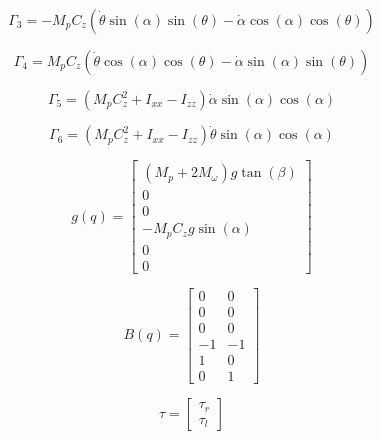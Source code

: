 \documentclass[11pt, twoside]{book}     %
\begin{document}
            \begin{equation}
                \Gamma_3= -M_pC_z(\dot{\theta}\sin(\alpha)\sin(\theta)-\dot{\alpha}\cos(\alpha)\cos(\theta))
            \end{equation}

            \begin{equation}
                \Gamma_4= M_pC_z(\dot{\theta}\cos(\alpha)\cos(\theta)-\dot{\alpha}\sin(\alpha)\sin(\theta))
            \end{equation}

            \begin{equation}
                \Gamma_5= (M_pC_z^{2}+I_{xx}-I_{zz})\dot{\alpha}\sin(\alpha)\cos(\alpha)
            \end{equation}

            \begin{equation}
                \Gamma_6= (M_pC_z^{2}+I_{xx}-I_{zz})\dot{\theta}\sin(\alpha)\cos(\alpha)
            \end{equation}


            \begin{equation}
                g(q) =
                \begin{bmatrix}
                    (M_p+2M_\omega)g\tan(\beta) \\
                    0 \\
                    0 \\
                    -M_pC_zg\sin(\alpha) \\
                    0  \\
                    0 
                \end{bmatrix}
            \end{equation}

            \begin{equation}
                B(q) =
                \begin{bmatrix}
                    0 & 0 \\
                    0 & 0 \\
                    0 & 0 \\
                    -1 & -1 \\
                    1 & 0  \\
                    0 & 1
                \end{bmatrix}
            \end{equation}

            \begin{equation}
                \tau =
                \begin{bmatrix}
                    \tau_r\\
                    \tau_l
                \end{bmatrix}
            \end{equation}
\end{document}
